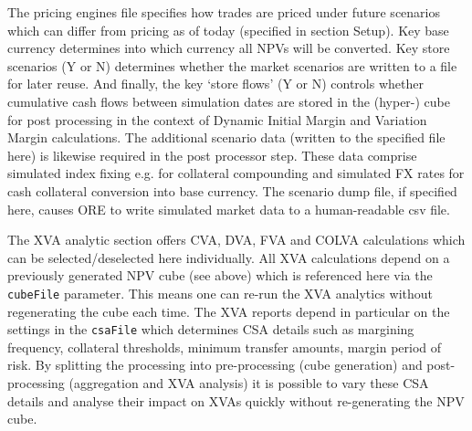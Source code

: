 \documentclass[12pt, a4paper]{article}
\begin{document}
The pricing engines file specifies how trades are priced under future scenarios which can differ from pricing as of
today (specified in section Setup).  Key base currency determines into which currency all NPVs will be converted. Key
store scenarios (Y or N) determines whether the market scenarios are written to a file for later reuse. And finally, the
key `store flows' (Y or N) controls whether cumulative cash flows between simulation dates are stored in the (hyper-)
cube for post processing in the context of Dynamic Initial Margin and Variation Margin calculations. The additional
scenario data (written to the specified file here) is likewise required in the post processor step. These data comprise
simulated index fixing e.g. for collateral compounding and simulated FX rates for cash collateral conversion into base
currency. The scenario dump file, if specified here, causes ORE to write simulated market data to a human-readable csv
file.
 
\medskip The XVA analytic section offers CVA, DVA, FVA and COLVA calculations which can be selected/deselected here
individually. All XVA calculations depend on a previously generated NPV cube (see above) which is referenced here via
the {\tt cubeFile} parameter. This means one can re-run the XVA analytics without regenerating the cube each time. The
XVA reports depend in particular on the settings in the {\tt csaFile} which determines CSA details such as margining
frequency, collateral thresholds, minimum transfer amounts, margin period of risk. By splitting the processing into
pre-processing (cube generation) and post-processing (aggregation and XVA analysis) it is possible to vary these CSA
details and analyse their impact on XVAs quickly without re-generating the NPV cube.
\end{document}
